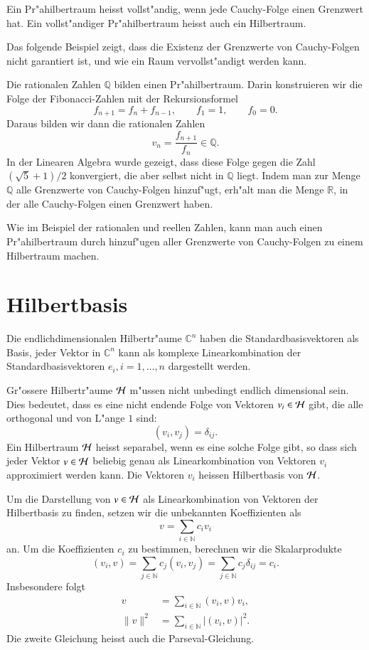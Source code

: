 \begin{definition}
Ein Pr"ahilbertraum heisst vollst"andig, wenn jede Cauchy-Folge einen
Grenzwert hat.
Ein vollst"andiger Pr"ahilbertraum heisst auch ein Hilbertraum.
\end{definition}

Das folgende Beispiel zeigt, dass die Existenz der Grenzwerte von
Cauchy-Folgen nicht garantiert ist, und wie ein Raum vervollst"andigt
werden kann.

\begin{beispiel}
Die rationalen Zahlen $\mathbb Q$ bilden einen Pr"ahilbertraum. 
Darin konstruieren wir die Folge der Fibonacci-Zahlen mit der 
Rekursionsformel
\[
f_{n+1}=f_n+f_{n-1},\qquad f_1=1, \qquad f_0=0.
\]
Daraus bilden wir dann die rationalen Zahlen
\[
v_n=\frac{f_{n+1}}{f_n}\in\mathbb Q.
\]
In der Linearen Algebra wurde gezeigt, dass diese Folge gegen
die Zahl $(\sqrt{5}+1)/2$ konvergiert, die aber selbst nicht in
$\mathbb Q$ liegt. Indem man zur Menge $\mathbb Q$ alle Grenzwerte
von Cauchy-Folgen hinzuf"ugt, erh"alt man die Menge $\mathbb R$, in der
alle Cauchy-Folgen einen Grenzwert haben.
\end{beispiel}

Wie im Beispiel der rationalen und reellen Zahlen,
kann man auch einen Pr"ahilbertraum durch hinzuf"ugen aller Grenzwerte
von Cauchy-Folgen zu einem Hilbertraum machen.


\section{Hilbertbasis}
Die endlichdimensionalen Hilbertr"aume $\mathbb C^n$ haben die
Standardbasisvektoren als Basis, jeder Vektor in $\mathbb C^n$
kann als komplexe Linearkombination der Standardbasisvektoren
$e_i,i=1,\dots,n$ dargestellt werden.

Gr"ossere Hilbertr"aume $\cal H$ m"ussen nicht unbedingt endlich dimensional
sein. Dies bedeutet, dass es eine nicht endende Folge von Vektoren
$v_i\in\cal H$ gibt, die alle orthogonal und von L"ange $1$ sind:
\[
(v_i,v_j)=\delta_{ij}.
\]
Ein Hilbertraum $\cal H$ heisst separabel, wenn es eine solche Folge
gibt, so dass sich jeder Vektor $v\in\cal H$ beliebig genau als
Linearkombination von Vektoren $v_i$ approximiert werden kann.
Die Vektoren $v_i$ heissen Hilbertbasis von $\cal H$.

Um die Darstellung von $v\in\cal H$ als Linearkombination von Vektoren
der Hilbertbasis zu finden, setzen wir die unbekannten Koeffizienten
als 
\[
v=\sum_{i\in\mathbb N}c_iv_i
\]
an. Um die Koeffizienten $c_i$ zu bestimmen, berechnen wir die
Skalarprodukte
\[
(v_i,v)
=\sum_{j\in\mathbb N} c_j(v_i,v_j)=\sum_{j\in\mathbb N}c_j\delta_{ij}=c_i.
\]
Insbesondere folgt
\begin{align*}
v&=\sum_{i\in\mathbb N}(v_i,v) v_i,\\
\| v\|^2&=\sum_{i\in\mathbb N} |(v_i,v)|^2.
\end{align*}
Die zweite Gleichung heisst auch die Parseval-Gleichung.

